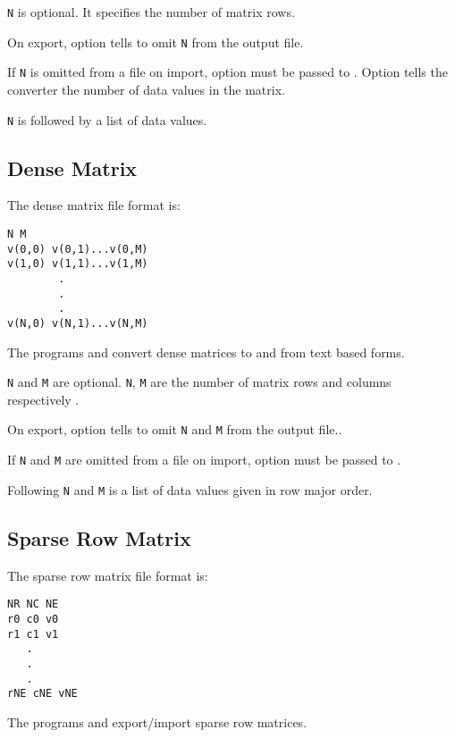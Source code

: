 \verb|N| is optional.  It specifies the number of matrix rows.  

On export, option  tells
 to omit \verb|N| from the output file.

If \verb|N| is omitted from a file on import, option
 must be passed to .
Option  tells the converter the number of data
values in the matrix.

\verb|N| is followed by a list of data values.

\subsection{Dense Matrix}
\label{sec:dense_matrix}

The dense matrix file format is:

\begin{verbatim}
N M
v(0,0) v(0,1)...v(0,M)
v(1,0) v(1,1)...v(1,M)
        .
        .
        .
v(N,0) v(N,1)...v(N,M)
\end{verbatim}

The programs  and  
convert dense matrices to and from text based forms.

\verb|N| and \verb|M| are optional.  \verb|N|, \verb|M| are the number
of matrix rows and columns respectively .  

On export, option  tells
 to omit \verb|N| and \verb|M| from the
output file..

If \verb|N| and \verb|M| are omitted from a file on import, option
 must be passed to
.

Following \verb|N| and \verb|M| is a list of data values given in row
major order.


\subsection{Sparse Row Matrix}
\label{sparse_row_matrix}

The sparse row matrix file format is:

\begin{verbatim}
NR NC NE
r0 c0 v0
r1 c1 v1
   .
   .
   .
rNE cNE vNE
\end{verbatim}

The programs  and
 export/import sparse row matrices.

